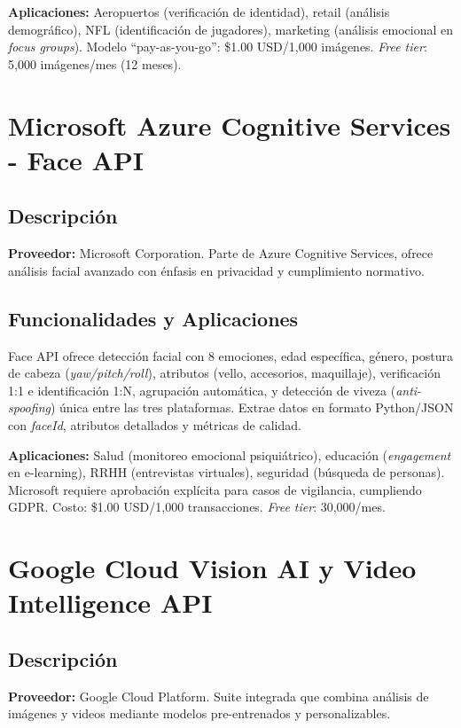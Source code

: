 \documentclass[12pt,a4paper]{article}
\begin{document}
\textbf{Aplicaciones:} Aeropuertos (verificación de identidad), retail (análisis demográfico), NFL (identificación de jugadores), marketing (análisis emocional en \textit{focus groups}). Modelo ``pay-as-you-go'': \$1.00 USD/1,000 imágenes. \textit{Free tier}: 5,000 imágenes/mes (12 meses).

\section{Microsoft Azure Cognitive Services - Face API}

\subsection{Descripción}
\textbf{Proveedor:} Microsoft Corporation. Parte de Azure Cognitive Services, ofrece análisis facial avanzado con énfasis en privacidad y cumplimiento normativo.

\subsection{Funcionalidades y Aplicaciones}
Face API ofrece detección facial con 8 emociones, edad específica, género, postura de cabeza (\textit{yaw/pitch/roll}), atributos (vello, accesorios, maquillaje), verificación 1:1 e identificación 1:N, agrupación automática, y detección de viveza (\textit{anti-spoofing}) única entre las tres plataformas. Extrae datos en formato Python/JSON con \textit{faceId}, atributos detallados y métricas de calidad.

\textbf{Aplicaciones:} Salud (monitoreo emocional psiquiátrico), educación (\textit{engagement} en e-learning), RRHH (entrevistas virtuales), seguridad (búsqueda de personas). Microsoft requiere aprobación explícita para casos de vigilancia, cumpliendo GDPR. Costo: \$1.00 USD/1,000 transacciones. \textit{Free tier}: 30,000/mes.

\section{Google Cloud Vision AI y Video Intelligence API}

\subsection{Descripción}
\textbf{Proveedor:} Google Cloud Platform. Suite integrada que combina análisis de imágenes y videos mediante modelos pre-entrenados y personalizables.
\end{document}
